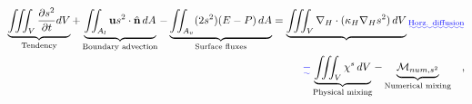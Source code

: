 \documentclass[draft]{agujournal2019}
\providecommand{\DIFadd}[1]{{\protect\color{blue}\uwave{#1}}} %
\providecommand{\DIFaddbegin}{} %
\providecommand{\DIFaddend}{} %
\providecommand{\DIFdelbegin}{} %
\providecommand{\DIFdelend}{} %
\begin{document}
\begin{linenomath*}
\begin{equation} \label{eq:salt2_vint}
    \begin{split}
        \DIFdelbegin %
\DIFdelend \DIFaddbegin \underbrace{\iiint_V \frac{\partial s^2}{\partial t}  dV}\DIFaddend _{\text{Tendency}} + \DIFdelbegin %
\DIFdelend \DIFaddbegin \underbrace{\iint_{A_l} \mathbf{u}s^2 \cdot \hat{\mathbf{n}} \,  dA}\DIFaddend _{\text{Boundary advection}}  - \underbrace{\iint_{A_{v}}(2s^2)(E-P) \, dA}_{\text{Surface fluxes}} = \DIFaddbegin \underbrace{\iiint_{V} \nabla_H \cdot (\kappa_H \nabla_H s^2) \, dV}\DIFadd{_{\text{Horz. diffusion}}}\DIFaddend \\
        \DIFdelbegin %
\DIFdelend \DIFaddbegin \DIFadd{-}\underbrace{\iiint_V \chi^s \, dV}\DIFaddend _{\text{Physical mixing}}-\underbrace{\mathcal{M}_{num, s^2}}_{\text{Numerical mixing}} \quad ,
   \end{split}
\end{equation}
\end{linenomath*}
\end{document}
